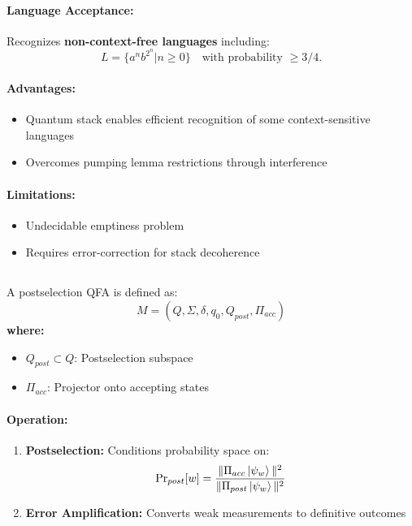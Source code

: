 \paragraph{Language Acceptance:}
Recognizes \textbf{non-context-free languages} including:
\[
L = \{a^nb^{2^n} | n \geq 0\} \quad \text{with probability } \geq 3/4. 
\]
\cite{bertoni2001quantum}

\paragraph{Advantages:}
\begin{itemize}
    \item Quantum stack enables efficient recognition of some context-sensitive languages \cite{ambainis2002quantum}
    \item Overcomes pumping lemma restrictions through interference
\end{itemize}

\paragraph{Limitations:}
\begin{itemize}
    \item Undecidable emptiness problem
    \item Requires error-correction for stack decoherence
\end{itemize}

\subsection{}
\label{subsec:psqfa}

\begin{definition}
A postselection QFA \cite{aaronson2005complexity} is defined as:
\[
M = (Q, \Sigma, \delta, q_0, Q_{post}, \Pi_{acc})
\]
\textbf{where:}
\begin{itemize}
    \item $Q_{post} \subset Q$: Postselection subspace
    \item $\Pi_{acc}$: Projector onto accepting states
\end{itemize}
\end{definition}

\paragraph{Operation:}
\begin{enumerate}
    \item \textbf{Postselection:} Conditions probability space on:
    \[
    \text{Pr}_{post}[w] = \frac{\|\Pi_{acc}\ket{\psi_w}\|^2}{\|\Pi_{post}\ket{\psi_w}\|^2}
    \]
    \item \textbf{Error Amplification:} Converts weak measurements to definitive outcomes \cite{yamakami2014constant}
\end{enumerate}

